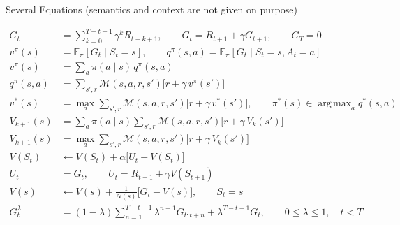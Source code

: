 \documentclass[11pt]{exam}
\DeclareMathOperator*{\argmax}{arg\,max}
\newcommand{\M}{\mathcal{M}}
\newcommand{\E}{\mathbb{E}}
\newcommand{\vpi}{v^{\pi}}
\newcommand{\qpi}{q^{\pi}}
\begin{document}
\begin{questions}

\newpage
Several Equations (semantics and context are not given on purpose)

\begin{align*}
G_t &= \sum_{k=0}^{T-t-1}\gamma^{k}R_{t+k+1}, \qquad G_t = R_{t+1}+\gamma G_{t+1}, \qquad G_T = 0 \\[4pt]
\vpi(s) &= \E_\pi[G_t\mid S_t=s], \qquad \qpi(s,a) = \E_\pi[G_t\mid S_t=s, A_t=a] \\[4pt]
\vpi(s) &= \sum_a \pi(a\mid s)\,\qpi(s,a) \\[4pt]
\qpi(s,a) &= \sum_{s',r}\M(s,a,r,s')\big[r+\gamma\,\vpi(s')\big] \\[4pt]
v^*(s) &= \max_a \sum_{s',r}\M(s,a,r,s')\big[r+\gamma\,v^*(s')\big], \qquad \pi^*(s)\in\argmax_a q^*(s,a) \\[4pt]
V_{k+1}(s) &= \sum_a \pi(a\mid s)\sum_{s',r}\M(s,a,r,s')\big[r+\gamma\,V_k(s')\big] \\[4pt]
V_{k+1}(s) &= \max_a \sum_{s',r}\M(s,a,r,s')\big[r+\gamma\,V_k(s')\big] \\[4pt]
V(S_t) &\leftarrow V(S_t)+\alpha\big[U_t-V(S_t)\big] \\[4pt]
U_t &= G_t, \qquad U_t = R_{t+1}+\gamma V(S_{t+1}) \\[4pt]
V(s) &\leftarrow V(s)+\frac{1}{N(s)}\big[G_t-V(s)\big], \qquad S_t=s \\[4pt]
G_t^{\lambda} &= (1-\lambda)\sum_{n=1}^{T-t-1}\lambda^{n-1}G_{t:t+n}+\lambda^{T-t-1}G_t, \qquad 0\le\lambda\le 1,\quad t<T
\end{align*}

\end{questions}
\end{document}
